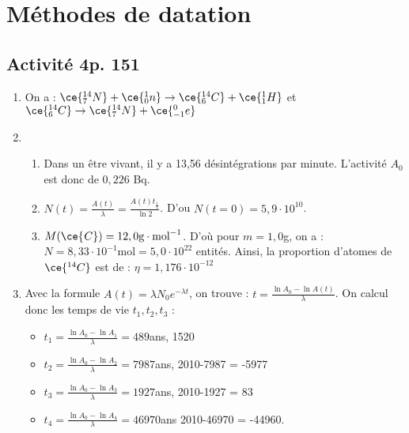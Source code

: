 \section{Méthodes de datation}
\subsection{Activité 4p. 151}

\begin{enumerate}
    \item On a : \( \ce{^{14}_{7}N} + \ce{^{1}_{0}n} \to \ce{^{14}_{6}C} + \ce{^{1}_{1}H}\) et \( \ce{^{14}_{6}C} \to \ce{^{14}_{7}N}+ \ce{^{0}_{-1}e}\) 
    \item \begin{enumerate}
            \item Dans un être vivant, il y a 13,56 désintégrations par minute. L'activité \(A_{0}\) est donc de $0,226$ Bq. 
            \item  \(N(t) = \frac{A(t)}{\lambda } = \frac{A(t)t_{\frac{1}{2}}}{\ln 2}\). D'ou \(N(t = 0) = 5,9 \cdot 10^{10}\).
            \item  \(M( \ce{^{}_{}C}) = 12,0 \text{g} \cdot \text{mol}^{-1}\). D'où pour \(m = 1,0\)g, on a : \(N = 8,33 \cdot 10^{-1}\text{mol} = 5,0 \cdot 10^{22}\) entités.  Ainsi, la proportion d'atomes de \( \ce{^{14}_{}C}\) est de : \(\eta  = 1,176 \cdot 10^{-12}\)  
    \end{enumerate}
    \item Avec la formule \(A(t) = \lambda N_{0} e^{ -\lambda t }\), on trouve : \(t = \frac{\ln A_{0} - \ln A(t)}{\lambda }\). On calcul donc les temps de vie \(t_{1}, t_{2}, t_{3}\) : 
            \begin{itemize}
                    \item \(t_{1} = \frac{\ln A_{0} - \ln A_{1}}{\lambda } = 489\)ans, 1520
                    \item \(t_{2} = \frac{\ln A_{0} - \ln A_{2}}{\lambda } = 7987\)ans, 2010-7987 = -5977
                    \item \(t_{3} = \frac{\ln A_{0} - \ln A_{3}}{\lambda }= 1927\)ans, 2010-1927 = 83
                    \item \(t_{4} = \frac{\ln A_{0} - \ln A_{4}}{\lambda } = 46 970\)ans    2010-46970 = -44960.
            \end{itemize}
\end{enumerate}

